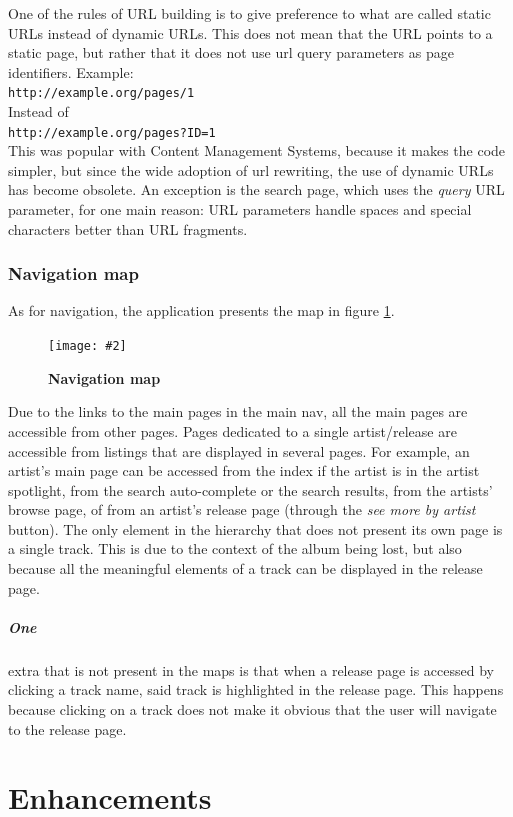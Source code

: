 \documentclass[10pt, a4paper]{article}
\newcommand{\figuremacro}[5]{
    \begin{figure}[#1]
        \centering
        \texttt{[image: \#2]}
        \caption[#3]{\textbf{#3}#4}
        \label{fig:#2}
    \end{figure}
}
\begin{document}
	One of the rules of URL building is to give preference to what are called static URLs instead of dynamic URLs. This does not mean that the URL points to a static page, but rather that it does not use url query parameters as page identifiers. Example:\\
	\texttt{http://example.org/pages/1}\\
	Instead of\\
	\texttt{http://example.org/pages?ID=1}\\
	 This was popular with Content Management Systems, because it makes the code simpler, but since the wide adoption of url rewriting, the use of dynamic URLs has become obsolete.
	 An exception is the search page, which uses the \textit{query} URL parameter, for one main reason: URL parameters handle spaces and special characters better than URL fragments.
	 
	 \subsubsection{Navigation map}
	 As for navigation, the application presents the map in figure \ref{fig:nav-map}.
	 
	 \figuremacro{h}{nav-map}{Navigation map}{}{1.0}
	 
	 Due to the links to the main pages in the main nav, all the main pages are accessible from other pages. Pages dedicated to a single artist/release are accessible from listings that are displayed in several pages.
	 For example, an artist's main page can be accessed from the index if the artist is in the artist spotlight, from the search auto-complete or the search results, from the artists' browse page, of from an artist's release page (through the \textit{see more by artist} button).
	 The only element in the hierarchy that does not present its own page is a single track. This is due to the context of the album being lost, but also because all the meaningful elements of a track can be displayed in the release page.
	 \subparagraph{One} extra that is not present in the maps is that when a release page is accessed by clicking a track name, said track is highlighted in the release page. This happens because clicking on a track does not make it obvious that the user will navigate to the release page.
	 
\section{Enhancements}
\label{sec:enhancements}
\end{document}
